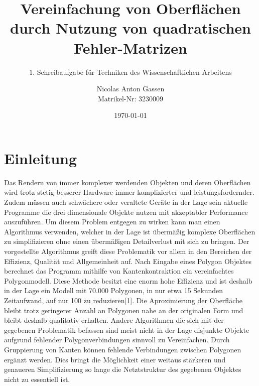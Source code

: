 \documentclass[runningheads]{llncs}
\begin{document}
    \title{Vereinfachung von Oberflächen durch Nutzung von quadratischen Fehler-Matrizen}
    
    
    \subtitle{1. Schreibaufgabe für Techniken des Wissenschaftlichen Arbeitens}
    
    \author{Nicolas Anton Gassen \\ Matrikel-Nr: 3230009 }
    
    
    \date{\today} 

\maketitle

\section{Einleitung}

Das Rendern von immer komplexer werdenden Objekten und deren Oberflächen wird trotz stetig besserer Hardware immer komplizierter und leistungsfordernder. Zudem müssen auch schwächere oder veraltete Geräte in der Lage sein aktuelle Programme die drei dimensionale Objekte nutzen mit akzeptabler Performance auszuführen. Um diesem Problem entgegen zu wirken kann man einen Algorithmus verwenden, welcher in der Lage ist übermäßig komplexe Oberflächen zu simplifizieren ohne einen übermäßigen Detailverlust mit sich zu bringen. \newline
Der vorgestellte Algorithmus greift diese Problematik vor allem in den Bereichen der Effizienz, Qualität und Allgemeinheit auf. Nach Eingabe eines Polygon Objektes berechnet das Programm mithilfe von Kantenkontraktion ein vereinfachtes Polygonmodell.\newline
Diese Methode besitzt eine enorm hohe Effizienz und ist deshalb in der Lage ein Modell mit 70.000 Polygonen, in nur etwa 15 Sekunden Zeitaufwand, auf nur 100 zu reduzieren[1]. Die Aproximierung der Oberfläche bleibt trotz geringerer Anzahl an Polygonen nahe an der originalen Form und bleibt deshalb qualitativ erhalten.\newline 
Andere Algorithmen die sich mit der gegebenen Problematik befassen sind meist nicht in der Lage disjunkte Objekte aufgrund fehlender Polygonverbindungen sinnvoll zu Vereinfachen.\newline
Durch Gruppierung von Kanten können fehlende Verbindungen zwischen Polygonen ergänzt werden. Dies bringt die Möglichkeit einer weitaus stärkeren und genaueren Simplifizierung so lange die Netztstruktur des gegebenen Objektes nicht zu essentiell ist.
\end{document}
